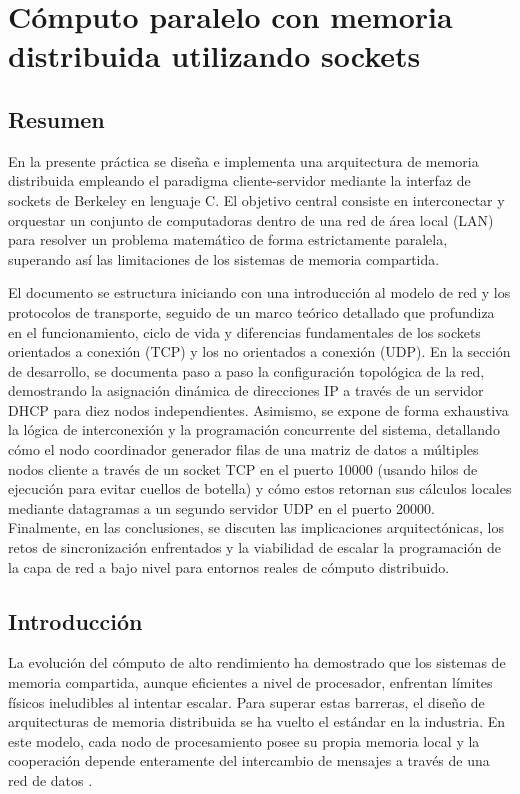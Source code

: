 \setcounter{chapter}{6}
\chapter{Cómputo paralelo con memoria distribuida utilizando sockets}

\section{Resumen}
En la presente práctica se diseña e implementa una arquitectura de memoria distribuida empleando el paradigma cliente-servidor mediante la interfaz de sockets de Berkeley en lenguaje C. El objetivo central consiste en interconectar y orquestar un conjunto de computadoras dentro de una red de área local (LAN) para resolver un problema matemático de forma estrictamente paralela, superando así las limitaciones de los sistemas de memoria compartida. 

El documento se estructura iniciando con una introducción al modelo de red y los protocolos de transporte, seguido de un marco teórico detallado que profundiza en el funcionamiento, ciclo de vida y diferencias fundamentales de los sockets orientados a conexión (TCP) y los no orientados a conexión (UDP). En la sección de desarrollo, se documenta paso a paso la configuración topológica de la red, demostrando la asignación dinámica de direcciones IP a través de un servidor DHCP para diez nodos independientes. Asimismo, se expone de forma exhaustiva la lógica de interconexión y la programación concurrente del sistema, detallando cómo el nodo coordinador generador filas de una matriz de datos a múltiples nodos cliente a través de un socket TCP en el puerto 10000 (usando hilos de ejecución para evitar cuellos de botella) y cómo estos retornan sus cálculos locales mediante datagramas a un segundo servidor UDP en el puerto 20000. Finalmente, en las conclusiones, se discuten las implicaciones arquitectónicas, los retos de sincronización enfrentados y la viabilidad de escalar la programación de la capa de red a bajo nivel para entornos reales de cómputo distribuido.

\section{Introducción}
La evolución del cómputo de alto rendimiento ha demostrado que los sistemas de memoria compartida, aunque eficientes a nivel de procesador, enfrentan límites físicos ineludibles al intentar escalar. Para superar estas barreras, el diseño de arquitecturas de memoria distribuida se ha vuelto el estándar en la industria. En este modelo, cada nodo de procesamiento posee su propia memoria local y la cooperación depende enteramente del intercambio de mensajes a través de una red de datos \cite{tanenbaum2012}.


